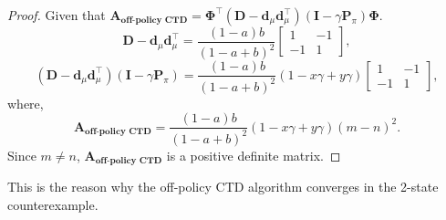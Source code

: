\begin{proof}
Given that 
$\textbf{A}_{\textbf{off-policy CTD}}=\bm{\Phi^{\top}}(\textbf{D}-\bm{d}_{\mu}\bm{d}_{\mu}^{\top})(\bm{I}-\gamma\textbf{P}_{\pi})\bm{\Phi}$.
\begin{equation*}
    \textbf{D}-\bm{d}_{\mu}\bm{d}_{\mu}^{\top}=\frac{(1-a)b}{(1-a+b)^{2}}\begin{bmatrix} 1 & -1 \\ -1 & 1 \end{bmatrix},
\end{equation*}
\begin{equation*}
    (\textbf{D}-\bm{d}_{\mu}\bm{d}_{\mu}^{\top})(\bm{I}-\gamma\textbf{P}_{\pi})=\frac{(1-a)b}{(1-a+b)^{2}}(1-x\gamma +y\gamma)\begin{bmatrix} 1 & -1 \\ -1 & 1 \end{bmatrix},
\end{equation*}
where, 
\begin{equation*}
    \textbf{A}_{\textbf{off-policy CTD}}=\frac{(1-a)b}{(1-a+b)^{2}}(1-x\gamma +y\gamma)(m-n)^2.
\end{equation*}
Since $m\neq n$, $\textbf{A}_{\textbf{off-policy CTD}}$ is a positive definite matrix.
\end{proof}
This is the reason why the off-policy CTD algorithm converges
 in the 2-state counterexample.
